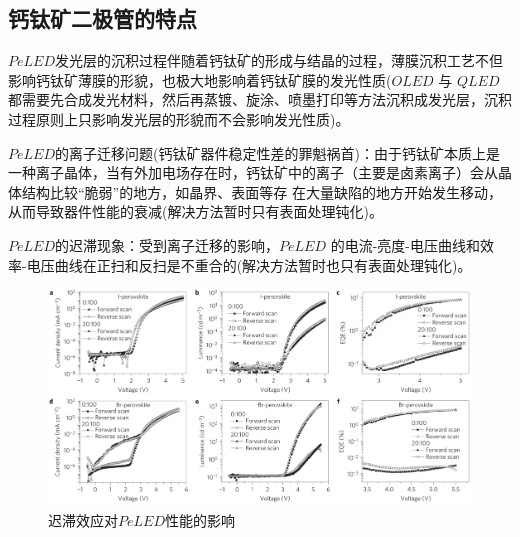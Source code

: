 \documentclass{beamer}[fontset=windows]
\begin{document}
\subsection{钙钛矿二极管的特点}
\begin{frame}
	\begin{itemize}\small{
		\item  $PeLED$发光层的沉积过程伴随着钙钛矿的形成与结晶的过程，薄膜沉积工艺不但影响钙钛矿薄膜的形貌，也极大地影响着钙钛矿膜的发光性质($OLED$ 与 $QLED$ 都需要先合成发光材料，然后再蒸镀、旋涂、喷墨打印等方法沉积成发光层，沉积过程原则上只影响发光层的形貌而不会影响发光性质)。
		\item $PeLED$的离子迁移问题(钙钛矿器件稳定性差的罪魁祸首)：由于钙钛矿本质上是一种离子晶体，当有外加电场存在时，钙钛矿中的离子（主要是卤素离子）会从晶体结构比较“脆弱”的地方，如晶界、表面等存
		在大量缺陷的地方开始发生移动，从而导致器件性能的衰减\cite{wang2016stability}(解决方法暂时只有表面处理钝化)。
		\item $PeLED$的迟滞现象：受到离子迁移的影响，$PeLED$ 的电流-亮度-电压曲线和效率-电压曲线在正扫和反扫是不重合的(解决方法暂时也只有表面处理钝化)。
	}
	\end{itemize}
\end{frame}
\begin{frame}
	\begin{figure}[H]
		\centering
		\hspace{2em}\includegraphics[width=1.0\linewidth]{pic/4.png}
		\caption{迟滞效应对$PeLED$性能的影响\cite{xiao2017efficient}
		}
	\end{figure}
\end{frame}
\end{document}
